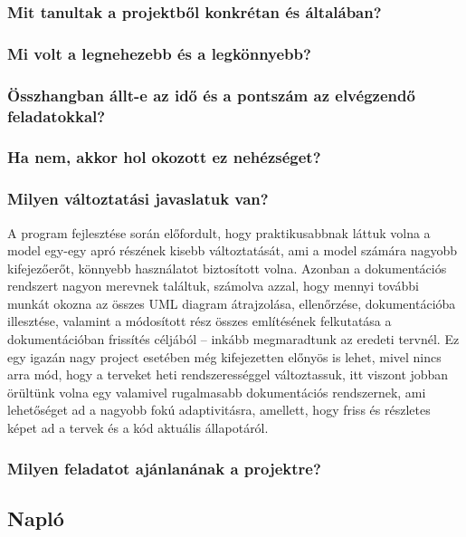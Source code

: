 		\subsubsection*{Mit tanultak a projektből konkrétan és általában?}
		
		\subsubsection*{Mi volt a legnehezebb és a legkönnyebb?}
		
		\subsubsection*{Összhangban állt-e az idő és a pontszám az elvégzendő feladatokkal?}
		
		\subsubsection*{Ha nem, akkor hol okozott ez nehézséget?}
		
		\subsubsection*{Milyen változtatási javaslatuk van?}
		A program fejlesztése során előfordult, hogy praktikusabbnak láttuk volna a model egy-egy apró részének kisebb változtatását, ami a model számára nagyobb kifejezőerőt, könnyebb használatot biztosított volna. Azonban a dokumentációs rendszert nagyon merevnek találtuk, számolva azzal, hogy mennyi további munkát okozna az összes UML diagram átrajzolása, ellenőrzése, dokumentációba illesztése, valamint a módosított rész összes említésének felkutatása a dokumentációban frissítés céljából -- inkább megmaradtunk az eredeti tervnél. Ez egy igazán nagy project esetében még kifejezetten előnyös is lehet, mivel nincs arra mód, hogy a terveket heti rendszerességgel változtassuk, itt viszont jobban örültünk volna egy valamivel rugalmasabb dokumentációs rendszernek, ami lehetőséget ad a nagyobb fokú adaptivitásra, amellett, hogy friss és részletes képet ad a tervek és a kód aktuális állapotáról.
		
		\subsubsection*{Milyen feladatot ajánlanának a projektre?}
		
	\subsection{Napló}

